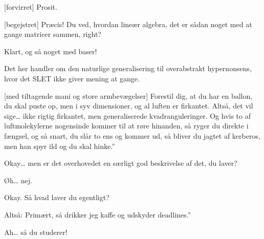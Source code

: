 \documentclass[a4paper,11pt]{article}
\begin{document}
\begin{sketch}
[forvirret] Prosit.

[begejstret] Præcis! Du ved, hvordan lineær algebra, det er sådan noget med at gange matricer sammen, right?

 Klart, og så noget med baser!

 Det her handler om den naturlige generalisering til overabstrakt hypernonsens, hvor det SLET ikke giver mening at gange.


[med tiltagende mani og store armbevægelser] Forestil dig, at du har en ballon, du skal puste op, men i syv dimensioner, og al luften er firkantet. Altså, det vil sige… ikke rigtig firkantet, men generaliserede kvadranguleringer. Og hvis to af luftmolekylerne nogensinde kommer til at røre hinanden, så ryger du direkte i fængsel, og så snart, du slår to ens og kommer ud, så bliver du jagtet af kerberos, men han spyr ild og du skal hinke.”

 Okay… men er det overhovedet en særligt god beskrivelse af det, du laver?

 Øh… nej.

 Okay. Så hvad laver du egentligt?

 Altså: Primært, så drikker jeg kaffe og udskyder deadlines.”

 Ah… så du studerer!


\end{sketch}
\end{document}
